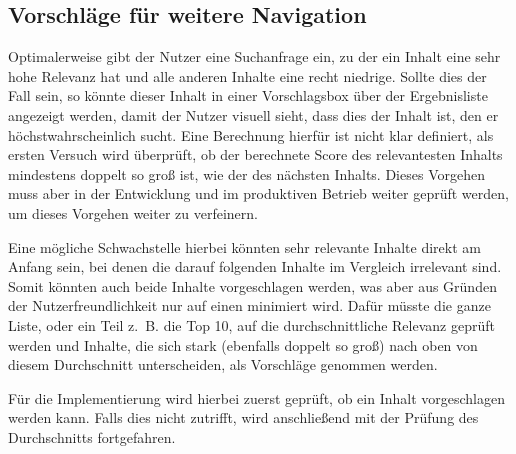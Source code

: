 \subsection{Vorschläge für weitere Navigation}
\label{sub:suggestion}
Optimalerweise gibt der Nutzer eine Suchanfrage ein, zu der ein Inhalt eine sehr hohe Relevanz hat und alle anderen Inhalte eine recht niedrige.
Sollte dies der Fall sein, so könnte dieser Inhalt in einer Vorschlagsbox über der Ergebnisliste angezeigt werden, damit der Nutzer visuell sieht, dass dies der Inhalt ist, den er höchstwahrscheinlich sucht.
Eine Berechnung hierfür ist nicht klar definiert, als ersten Versuch wird überprüft, ob der berechnete Score des relevantesten Inhalts mindestens doppelt so groß ist, wie der des nächsten Inhalts.
Dieses Vorgehen muss aber in der Entwicklung und im produktiven Betrieb weiter geprüft werden, um dieses Vorgehen weiter zu verfeinern.

Eine mögliche Schwachstelle hierbei könnten sehr relevante Inhalte direkt am Anfang sein, bei denen die darauf folgenden Inhalte im Vergleich irrelevant sind.
Somit könnten auch beide Inhalte vorgeschlagen werden, was aber aus Gründen der Nutzerfreundlichkeit nur auf einen minimiert wird.
Dafür müsste die ganze Liste, oder ein Teil z. B. die Top 10, auf die durchschnittliche Relevanz geprüft werden und Inhalte, die sich stark (ebenfalls doppelt so groß) nach oben von diesem Durchschnitt unterscheiden, als Vorschläge genommen werden.

Für die Implementierung wird hierbei zuerst geprüft, ob ein Inhalt vorgeschlagen werden kann. Falls dies nicht zutrifft, wird anschließend mit der Prüfung des Durchschnitts fortgefahren.

